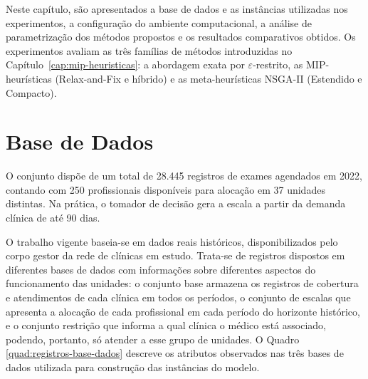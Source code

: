\label{cap:resultados}

Neste capítulo, são apresentados a base de dados e as instâncias utilizadas nos experimentos, a configuração do ambiente computacional, a análise de parametrização dos métodos propostos e os resultados comparativos obtidos. Os experimentos avaliam as três famílias de métodos introduzidas no Capítulo~\ref{cap:mip-heuristicas}: a abordagem exata por $\varepsilon$-restrito, as MIP-heurísticas (Relax-and-Fix e híbrido) e as meta-heurísticas NSGA-II (Estendido e Compacto).

\section{Base de Dados}
\label{cap:resultados:instancias}

O conjunto dispõe de um total de 28.445 registros de exames agendados em 2022, contando com 250 profissionais disponíveis para alocação em 37 unidades distintas. Na prática, o tomador de decisão gera a escala a partir da demanda clínica de até 90 dias.

O trabalho vigente baseia-se em dados reais históricos, disponibilizados pelo corpo gestor da rede de clínicas em estudo. Trata-se de registros dispostos em diferentes bases de dados com informações sobre diferentes aspectos do funcionamento das unidades: o conjunto base armazena os registros de cobertura e atendimentos de cada clínica em todos os períodos, o conjunto de escalas que apresenta a alocação de cada profissional em cada período do horizonte histórico, e o conjunto restrição que informa a qual clínica o médico está associado, podendo, portanto, só atender a esse grupo de unidades. O Quadro \ref{quad:registros-base-dados} descreve os atributos observados nas três bases de dados utilizada para construção das instâncias do modelo.

